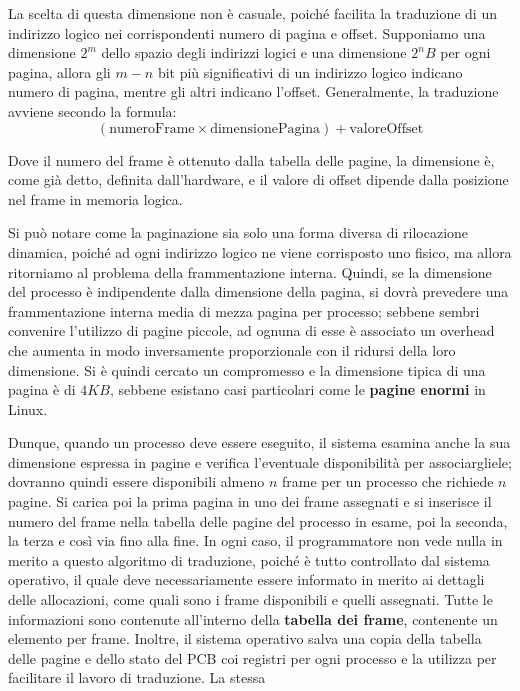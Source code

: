 \noindent La scelta di questa dimensione non è casuale, poiché facilita la traduzione di un indirizzo logico nei corrispondenti numero di pagina e
offset. Supponiamo una dimensione $2^m$ dello spazio degli indirizzi logici e una dimensione $2^nB$ per ogni pagina, allora gli $m-n$ bit più
significativi di un indirizzo logico indicano numero di pagina, mentre gli altri indicano l'offset. Generalmente, la traduzione avviene secondo la
formula: \[
    (\text{numeroFrame} \times \text{dimensionePagina}) + \text{valoreOffset}
\]

\noindent Dove il numero del frame è ottenuto dalla tabella delle pagine, la dimensione è, come già detto, definita dall'hardware, e il valore di offset
dipende dalla posizione nel frame in memoria logica.\par
Si può notare come la paginazione sia solo una forma diversa di rilocazione dinamica, poiché ad ogni indirizzo logico ne viene corrisposto uno fisico,
ma allora ritorniamo al problema della frammentazione interna. Quindi, se la dimensione del processo è indipendente dalla dimensione della pagina, si
dovrà prevedere una frammentazione interna media di mezza pagina per processo; sebbene sembri convenire l'utilizzo di pagine piccole, ad ognuna di
esse è associato un overhead che aumenta in modo inversamente proporzionale con il ridursi della loro dimensione. Si è quindi cercato un compromesso e
la dimensione tipica di una pagina è di $4KB$, sebbene esistano casi particolari come le \textbf{pagine enormi} in Linux.\par
Dunque, quando un processo deve essere eseguito, il sistema esamina anche la sua dimensione espressa in pagine e verifica l'eventuale disponibilità per
associargliele; dovranno quindi essere disponibili almeno $n$ frame per un processo che richiede $n$ pagine. Si carica poi la prima pagina in uno dei
frame assegnati e si inserisce il numero del frame nella tabella delle pagine del processo in esame, poi la seconda, la terza e così via fino alla fine.
In ogni caso, il programmatore non vede nulla in merito a questo algoritmo di traduzione, poiché è tutto controllato dal sistema operativo, il quale
deve necessariamente essere informato in merito ai dettagli delle allocazioni, come quali sono i frame disponibili e quelli assegnati. Tutte le
informazioni sono contenute all'interno della \textbf{tabella dei frame}, contenente un elemento per frame. Inoltre, il sistema operativo salva una
copia della tabella delle pagine e dello stato del PCB coi registri per ogni processo e la utilizza per facilitare il lavoro di traduzione. La stessa
